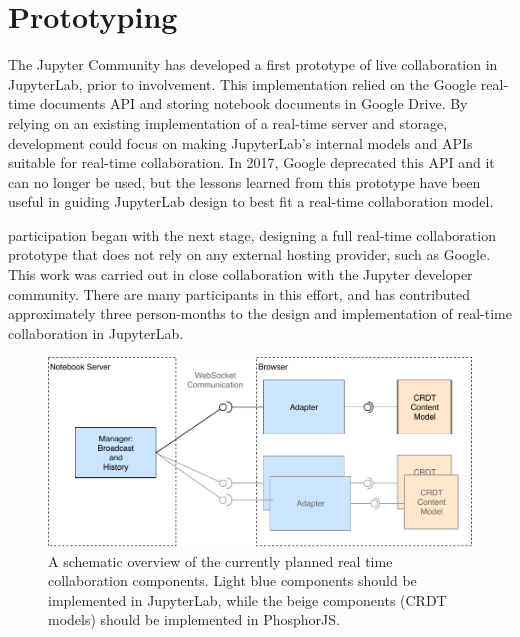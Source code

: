 \documentclass{deliverablereport}
\begin{document}

\section{Prototyping}

The Jupyter Community has developed a first prototype of live collaboration in JupyterLab,
prior to \ODK involvement.
This implementation relied on the Google real-time documents API and storing notebook documents in Google Drive.
By relying on an existing implementation of a real-time server and storage,
development could focus on making JupyterLab's
internal models and APIs suitable for real-time collaboration.
In 2017, Google deprecated this API and it can no longer be used,
but the lessons learned from this prototype have been useful in guiding JupyterLab design to best fit a real-time collaboration model.

\ODK participation began with the next stage, designing a full real-time collaboration prototype
that does not rely on any external hosting provider,
such as Google.
This work was carried out in close collaboration with the Jupyter developer community.
There are many participants in this effort, and \ODK has contributed approximately
three person-months to the design and implementation of real-time collaboration in JupyterLab.


\begin{figure}[h]
  \centering
  \includegraphics[scale=0.6]{lab-RTC.pdf}
  \caption{A schematic overview of the currently planned real time collaboration components.
    Light blue components should be implemented in JupyterLab, while the beige
    components (CRDT models) should be implemented in PhosphorJS.}
  \label{fig:rtc-components}
\end{figure}
\end{document}
